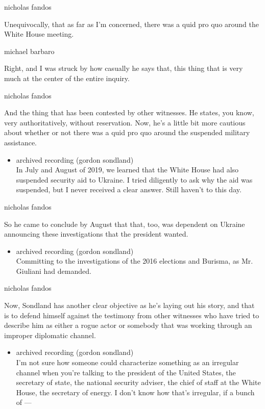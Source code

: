 nicholas fandos

Unequivocally, that as far as I'm concerned, there was a quid pro quo
around the White House meeting.

michael barbaro

Right, and I was struck by how casually he says that, this thing that is
very much at the center of the entire inquiry.

nicholas fandos

And the thing that has been contested by other witnesses. He states, you
know, very authoritatively, without reservation. Now, he's a little bit
more cautious about whether or not there was a quid pro quo around the
suspended military assistance.

\begin{itemize}
\tightlist
\item
  archived recording (gordon sondland)\\
  In July and August of 2019, we learned that the White House had also
  suspended security aid to Ukraine. I tried diligently to ask why the
  aid was suspended, but I never received a clear answer. Still haven't
  to this day.
\end{itemize}

nicholas fandos

So he came to conclude by August that that, too, was dependent on
Ukraine announcing these investigations that the president wanted.

\begin{itemize}
\tightlist
\item
  archived recording (gordon sondland)\\
  Committing to the investigations of the 2016 elections and Burisma, as
  Mr. Giuliani had demanded.
\end{itemize}

nicholas fandos

Now, Sondland has another clear objective as he's laying out his story,
and that is to defend himself against the testimony from other witnesses
who have tried to describe him as either a rogue actor or somebody that
was working through an improper diplomatic channel.

\begin{itemize}
\tightlist
\item
  archived recording (gordon sondland)\\
  I'm not sure how someone could characterize something as an irregular
  channel when you're talking to the president of the United States, the
  secretary of state, the national security adviser, the chief of staff
  at the White House, the secretary of energy. I don't know how that's
  irregular, if a bunch of ---
\end{itemize}

